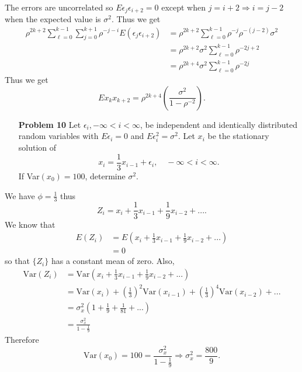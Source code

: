 \documentclass[11pt]{article}
\theoremstyle{definition}
\newcommand{\1}[1]{\mathbf{1} \left \{ #1 \right \}}
\begin{document}
The errors are uncorrelated so $E\epsilon_j \epsilon_{i+2} = 0$ except when $j=i+2 \Rightarrow i=j-2$ when the expected value is $\sigma^2$.  Thus we get
\begin{align*}
    \rho^{2k+2} \sum_{\ell=0}^{k-1} \sum_{j=0}^{k+1} \rho^{-j-i} E(\epsilon_j \epsilon_{i+2}) &= \rho^{2k+2} \sum_{\ell=0}^{k-1} \rho^{-j}\rho^{-(j-2)} \sigma^2 \\
    &= \rho^{2k+2} \sigma^2 \sum_{\ell=0}^{k-1} \rho^{-2j+2} \\
    &= \rho^{2k+4} \sigma^2 \sum_{\ell=0}^{k-1} \rho^{-2j}
\end{align*}
Thus we get
\[Ex_k x_{k+2} = \rho^{2k+4} \left(\frac{\sigma^2}{1 - \rho^{-2}}\right).\]

\begin{itemize}
    \item [{\color{red} \textbf{Problem 10}}] Let $\epsilon_i, -\infty<i<\infty$, be independent and identically distributed random variables with $E\epsilon_i = 0$ and $E\epsilon_i^2 = \sigma^2$.  Let $x_i$ be the stationary solution of
    \[x_i = \frac{1}{3}x_{i-1} + \epsilon_i, \quad -\infty<i<\infty.\]
    If Var$(x_0) = 100$, determine $\sigma^2$.
\end{itemize}
We have $\phi = \frac{1}{3}$ thus
\[Z_i = x_i + \frac{1}{3}x_{i-1} + \frac{1}{9}x_{i-2} + ....\]
We know that
\begin{align*}
    E(Z_i) &= E\left(x_i + \frac{1}{3}x_{i-1} + \frac{1}{9}x_{i-2} + ... \right) \\
    &= 0
\end{align*}
so that $\{Z_i\}$ has a constant mean of zero.  Also,
\begin{align*}
    \text{Var}(Z_i) &= \text{Var}\left(x_i + \frac{1}{3}x_{i-1} + \frac{1}{9}x_{i-2} + ...\right) \\
    &=  \text{Var}(x_i) + \left(\frac{1}{3}\right)^2 \text{Var}(x_{i-1}) + \left(\frac{1}{3}\right)^4 \text{Var}(x_{i-2}) + ... \\
    &= \sigma_x^2 \left(1 + \frac{1}{9} + \frac{1}{81} + ...\right) \\
    &= \frac{\sigma_x^2}{1 - \frac{1}{9}}
\end{align*}
Therefore
\[\text{Var}(x_0) = 100 = \frac{\sigma_x^2}{1 - \frac{1}{9}} \Rightarrow \sigma_x^2 = \frac{800}{9}.\]
\end{document}
